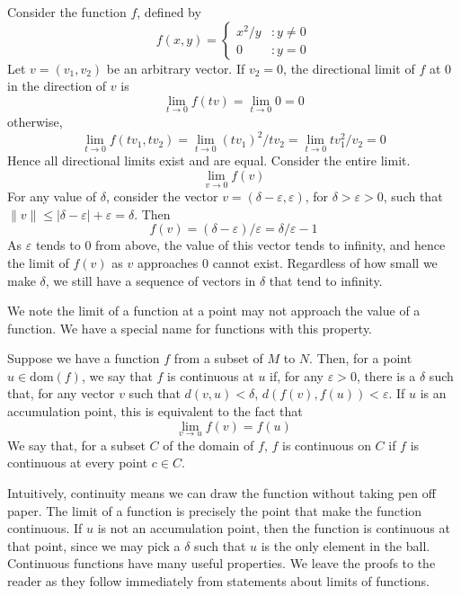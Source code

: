 Consider the function $f$, defined by
%
\[ f(x,y) = \left\{
     \begin{array}{lr}
       x^2/y & : y \neq 0\\
       0 & : y = 0
     \end{array}
   \right.\]
%
Let $v = (v_1, v_2)$ be an arbitrary vector. If $v_2 = 0$, the directional limit of $f$ at 0 in the direction of $v$ is
%
\[ \lim_{t \to 0} f(tv) = \lim_{t \to 0} 0 = 0 \]
%
otherwise,
%
\[ \lim_{t \to 0} f(tv_1, tv_2) = \lim_{t \to 0} (tv_1)^2/tv_2 = \lim_{t \to 0} t v_1^2/v_2 = 0 \]
%
Hence all directional limits exist and are equal. Consider the entire limit.
%
\[ \lim_{v \to 0} f(v) \]
%
For any value of $\delta$, consider the vector $v = (\delta - \varepsilon, \varepsilon)$, for $\delta > \varepsilon > 0$, such that $\|v\| \leq |\delta - \varepsilon| + \varepsilon = \delta$. Then
%
\[ f(v) = (\delta - \varepsilon)/\varepsilon = \delta/\varepsilon - 1 \]
%
As $\varepsilon$ tends to 0 from above, the value of this vector tends to infinity, and hence the limit of $f(v)$ as $v$ approaches 0 cannot exist. Regardless of how small we make $\delta$, we still have a sequence of vectors in $\delta$ that tend to infinity.

We note the limit of a function at a point may not approach the value of a function. We have a special name for functions with this property.

\begin{definition}
  Suppose we have a function $f$ from a subset of $M$ to $N$. Then, for a point $u \in \text{dom}(f)$, we say that $f$ is continuous at $u$ if, for any $\varepsilon > 0$, there is a $\delta$ such that, for any vector $v$ such that $d(v, u) < \delta$, $d(f(v), f(u)) < \varepsilon$. If $u$ is an accumulation point, this is equivalent to the fact that
  \[ \lim_{v \to u} f(v) = f(u) \]
  We say that, for a subset $C$ of the domain of $f$, $f$ is continuous on $C$ if $f$ is continuous at every point $c \in C$.
\end{definition}

Intuitively, continuity means we can draw the function without taking pen off paper. The limit of a function is precisely the point that make the function continuous. If $u$ is not an accumulation point, then the function is continuous at that point, since we may pick a $\delta$ such that $u$ is the only element in the ball. Continuous functions have many useful properties. We leave the proofs to the reader as they follow immediately from statements about limits of functions.

